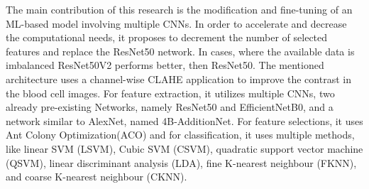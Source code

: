The main contribution of this research is the modification and fine-tuning of an ML-based model involving multiple CNNs. In order to accelerate and decrease the computational needs, it proposes to decrement the number of selected features and replace the ResNet50 network. In cases, where the available data is imbalanced ResNet50V2 performs better, then ResNet50\cite{ResNet50V2Better}. The mentioned architecture uses a channel-wise CLAHE application to improve the contrast in the blood cell images. For feature extraction, it utilizes multiple CNNs, two already pre-existing Networks, namely ResNet50 and EfficientNetB0, and a network similar to AlexNet, named 4B-AdditionNet. For feature selections, it uses Ant Colony Optimization(ACO) and for classification, it uses multiple methods, like linear SVM (LSVM), Cubic SVM (CSVM), quadratic support vector machine (QSVM), linear discriminant analysis (LDA), fine K-nearest neighbour (FKNN), and coarse K-nearest neighbour (CKNN).
